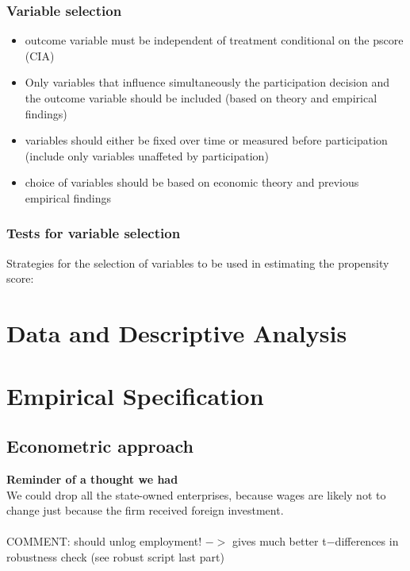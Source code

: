\documentclass[a4paper,12pt]{scrartcl}
\begin{document}
\subsubsection*{Variable selection}
\begin{itemize}
\item outcome variable must be independent of treatment conditional on the pscore (CIA)
\item Only variables that influence simultaneously the participation decision and the outcome variable should be included (based on theory and empirical findings)
\item variables should either be fixed over time or measured before participation (include only variables unaffeted by participation)
\item choice of variables should be based on economic theory and previous empirical findings
\end{itemize}

\subsubsection*{Tests for variable selection}
Strategies for the selection of variables to be used in estimating the propensity score:



\section{Data and Descriptive Analysis}

\section{Empirical Specification}
\subsection{Econometric approach}
\textbf{Reminder of a thought we had}\\
We could drop all the state-owned enterprises, because wages are likely not to change just because the firm received foreign investment. \\\\
COMMENT: should unlog employment! $->$ gives much better t$-$differences in robustness check (see robust script last part)\\
\end{document}
